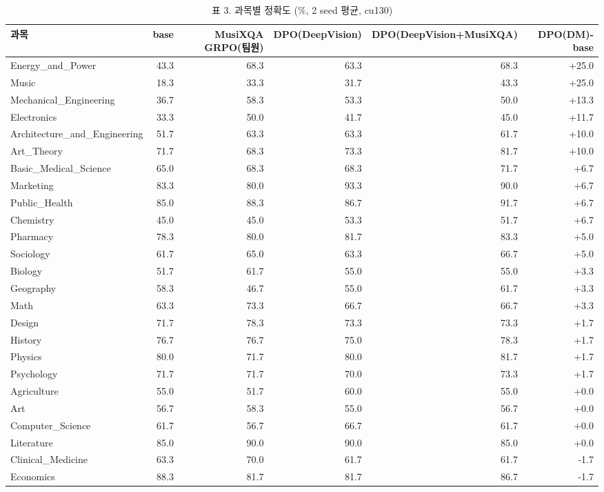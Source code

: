 \begin{table}[t]
\centering
\small
\caption{표 3. 과목별 정확도 (\%, 2 seed 평균, cu130)}
\label{tab:table3_subjects_cu130}
\begin{tabular}{lrrrrr}
\toprule
과목 & base & MusiXQA GRPO(팀원) & DPO(DeepVision) & DPO(DeepVision+MusiXQA) & DPO(DM)-base \\
\midrule
Energy\_and\_Power & 43.3 & 68.3 & 63.3 & 68.3 & +25.0 \\
Music & 18.3 & 33.3 & 31.7 & 43.3 & +25.0 \\
Mechanical\_Engineering & 36.7 & 58.3 & 53.3 & 50.0 & +13.3 \\
Electronics & 33.3 & 50.0 & 41.7 & 45.0 & +11.7 \\
Architecture\_and\_Engineering & 51.7 & 63.3 & 63.3 & 61.7 & +10.0 \\
Art\_Theory & 71.7 & 68.3 & 73.3 & 81.7 & +10.0 \\
Basic\_Medical\_Science & 65.0 & 68.3 & 68.3 & 71.7 & +6.7 \\
Marketing & 83.3 & 80.0 & 93.3 & 90.0 & +6.7 \\
Public\_Health & 85.0 & 88.3 & 86.7 & 91.7 & +6.7 \\
Chemistry & 45.0 & 45.0 & 53.3 & 51.7 & +6.7 \\
Pharmacy & 78.3 & 80.0 & 81.7 & 83.3 & +5.0 \\
Sociology & 61.7 & 65.0 & 63.3 & 66.7 & +5.0 \\
Biology & 51.7 & 61.7 & 55.0 & 55.0 & +3.3 \\
Geography & 58.3 & 46.7 & 55.0 & 61.7 & +3.3 \\
Math & 63.3 & 73.3 & 66.7 & 66.7 & +3.3 \\
Design & 71.7 & 78.3 & 73.3 & 73.3 & +1.7 \\
History & 76.7 & 76.7 & 75.0 & 78.3 & +1.7 \\
Physics & 80.0 & 71.7 & 80.0 & 81.7 & +1.7 \\
Psychology & 71.7 & 71.7 & 70.0 & 73.3 & +1.7 \\
Agriculture & 55.0 & 51.7 & 60.0 & 55.0 & +0.0 \\
Art & 56.7 & 58.3 & 55.0 & 56.7 & +0.0 \\
Computer\_Science & 61.7 & 56.7 & 66.7 & 61.7 & +0.0 \\
Literature & 85.0 & 90.0 & 90.0 & 85.0 & +0.0 \\
Clinical\_Medicine & 63.3 & 70.0 & 61.7 & 61.7 & -1.7 \\
Economics & 88.3 & 81.7 & 81.7 & 86.7 & -1.7 \\

\end{tabular}
\end{table}
